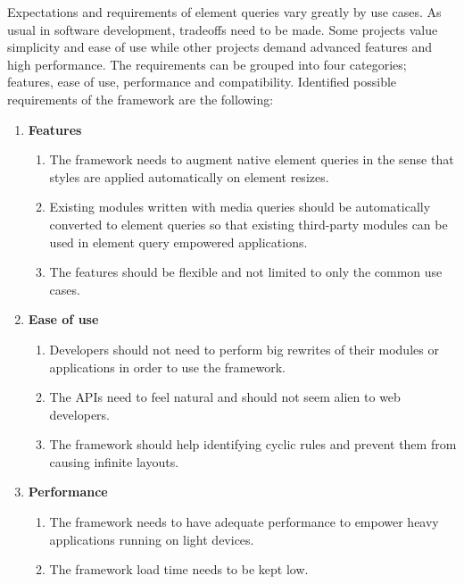 \documentclass[a4paper,11pt]{kth-mag}
\begin{document}
        Expectations and requirements of element queries vary greatly by use cases.
        As usual in software development, tradeoffs need to be made.
        Some projects value simplicity and ease of use while other projects demand advanced features and high performance.
        The requirements can be grouped into four categories; features, ease of use, performance and compatibility.
        Identified possible requirements of the framework are the following:
        \begin{enumerate}
          \item \textbf{Features}
            \begin{enumerate}
              \item\label{itm:req_resize_detect} The framework needs to augment \gls{native} element queries in the sense that styles are applied automatically on \gls{element} resizes.
              \item Existing modules written with \gls{media queries} should be automatically converted to element queries so that existing third-party modules can be used in element query empowered applications.
              \item The features should be flexible and not limited to only the common use cases.
            \end{enumerate}
          \item \textbf{Ease of use}
            \begin{enumerate}
              \item\label{itm:req_big_rewrite} Developers should not need to perform big rewrites of their modules or applications in order to use the framework.
              \item\label{itm:natural} The \glspl{API} need to feel natural and should not seem alien to \gls{web} developers.
              \item The framework should help identifying cyclic rules and prevent them from causing infinite layouts.
            \end{enumerate}
          \item \textbf{Performance}
            \begin{enumerate}
              \item The framework needs to have adequate performance to empower heavy applications running on light devices.
              \item The framework load time needs to be kept low.
            \end{enumerate}

\end{enumerate}
\end{document}
